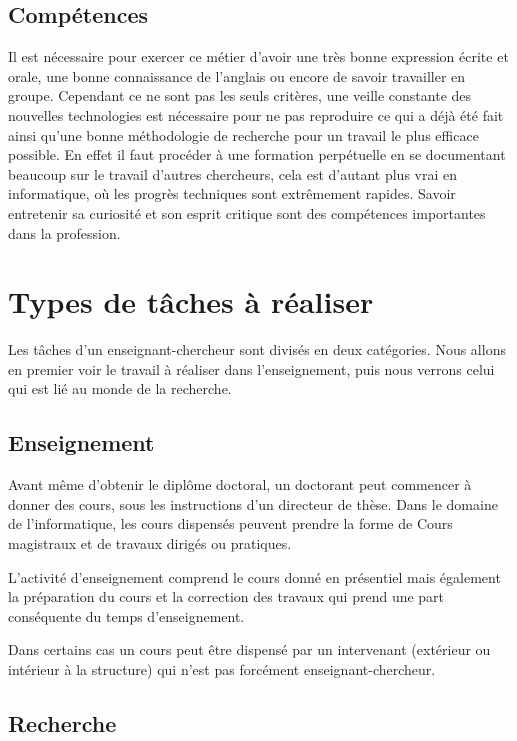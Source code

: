 \documentclass[14pt, a4paper]{report}
\begin{document}
    \subsection{Compétences}

    Il est nécessaire pour exercer ce métier d’avoir une très bonne expression écrite et orale, une bonne connaissance de l’anglais ou encore de savoir travailler en groupe. Cependant ce ne sont pas les seuls critères, une veille constante des nouvelles technologies est nécessaire pour ne pas reproduire ce qui a déjà été fait ainsi qu’une bonne méthodologie de recherche pour un travail le plus efficace possible. En effet il faut procéder à une formation perpétuelle en se documentant beaucoup sur le travail d’autres chercheurs, cela est d’autant plus vrai en informatique, où les progrès techniques sont extrêmement rapides.
    Savoir entretenir sa curiosité et son esprit critique sont des compétences importantes dans la profession.

  \section{Types de tâches à réaliser}

  Les tâches d'un enseignant-chercheur sont divisés en deux catégories. Nous allons en premier voir le travail à réaliser dans l'enseignement, puis nous verrons celui qui est lié au monde de la recherche.

    \subsection{Enseignement}

    Avant même d'obtenir le diplôme doctoral, un doctorant peut commencer à donner des cours, sous les instructions d'un directeur de thèse.
    Dans le domaine de l'informatique, les cours dispensés peuvent prendre la forme de Cours magistraux et de travaux dirigés ou pratiques. 

    L'activité d'enseignement comprend le cours donné en présentiel mais également la préparation du cours et la correction des travaux qui prend une part conséquente du temps d'enseignement.

    Dans certains cas un cours peut être dispensé par un intervenant (extérieur ou intérieur à la structure) qui n'est pas forcément enseignant-chercheur.

    \subsection{Recherche}
\end{document}

